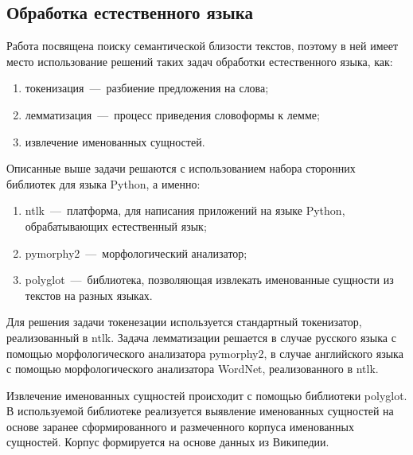\subsection{Обработка естественного языка}
    Работа посвящена поиску семантической близости текстов, поэтому в ней имеет место использование решений таких задач обработки естественного языка, как:
    \begin{enumerate}
        \item токенизация~---~разбиение предложения на слова;
        \item лемматизация~---~процесс приведения словоформы к лемме;
        \item извлечение именованных сущностей.
    \end{enumerate}
    Описанные выше задачи решаются с использованием набора сторонних библиотек для языка Python, а именно:
    \begin{enumerate}
        \item ntlk~---~платформа, для написания приложений на языке Python, обрабатывающих естественный язык;
        \item pymorphy2~---~морфологический анализатор;
        \item polyglot~---~библиотека, позволяющая извлекать именованные сущности из текстов на разных языках.
    \end{enumerate}

    Для решения задачи токенезации используется стандартный токенизатор, реализованный в ntlk.
    Задача лемматизации решается в случае русского языка с помощью морфологического анализатора pymorphy2,
    в случае английского языка с помощью морфологического анализатора WordNet, реализованного в ntlk.

    Извлечение именованных сущностей происходит с помощью библиотеки polyglot.
    В используемой библиотеке реализуется выявление именованных сущностей на основе заранее сформированного и размеченного корпуса именованных сущностей.
    Корпус формируется на основе данных из Википедии.
%
%
%
%
%
%
%
%
